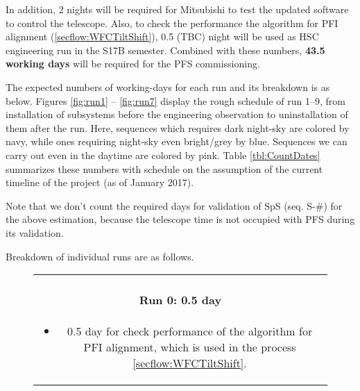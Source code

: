In addition, 2 nights will be required for Mitsubishi to test the updated software to control the telescope.
Also, to check the performance the algorithm for PFI alignment (\ref{secflow:WFCTiltShift}), 0.5 (TBC) night will be used as HSC engineering run in the S17B semester.
Combined with these numbers, {\bf 43.5 working days} will be required for the PFS commissioning.

The expected numbers of working-days for each run and its breakdown is as below.
Figures \ref{fig:run1} -- \ref{fig:run7}  display the rough schedule of run 1--9, from installation of subsystems before the engineering observation to uninstallation of them after the run.
Here, sequences which requires dark night-sky are colored by navy, while ones requiring night-sky even bright/grey by blue.
Sequences we can carry out even in the daytime are colored by pink.
Table \ref{tbl:CountDates} summarizes these numbers with schedule on the assumption of the current timeline of the project (as of January 2017).

Note that we don't count the required days for validation of SpS (seq. S-\#) for the above estimation, because the telescope time is not occupied with PFS during its validation.

\bigskip

Breakdown of individual runs are as follows.

\begin{figure}[!ht]
\begin{center}
\begin{tabular}{c}
\begin{minipage}{0.95\hsize}
\paragraph{Run 0: 0.5 day}
	\begin{itemize}
	\item 0.5 day for check performance of the algorithm for PFI alignment, which is used in the process \ref{secflow:WFCTiltShift}.
	\end{itemize}
\end{minipage}
\end{tabular}
\end{center}
\end{figure}

